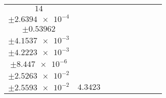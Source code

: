 \documentclass[8pt]{article}
\begin{document}
\begin{longtable}[l]{c c c c c c c c c}
$\num{14}$ & \begin{tabular}[c]{@{}c@{}}$\num{2.893e-2}$ \\ $\pm\num{2.6394e-4}$\end{tabular} & \begin{tabular}[c]{@{}c@{}}$\num{-0.44904}$ \\ $\pm\num{0.53962}$\end{tabular} & \begin{tabular}[c]{@{}c@{}}$\num{7.544}$ \\ $\pm\num{4.1537e-3}$\end{tabular} & \begin{tabular}[c]{@{}c@{}}$\num{2.1509e+3}$ \\ $\pm\num{4.2223e-3}$\end{tabular} & \begin{tabular}[c]{@{}c@{}}$\num{4.3031}$ \\ $\pm\num{8.447e-6}$\end{tabular} & \begin{tabular}[c]{@{}c@{}}$\num{2.3813}$ \\ $\pm\num{2.5263e-2}$\end{tabular} & \begin{tabular}[c]{@{}c@{}}$\num{2.3874}$ \\ $\pm\num{2.5593e-2}$\end{tabular} & $\num{4.3423}$\\
\bottomrule
\end{longtable}
\end{document}

